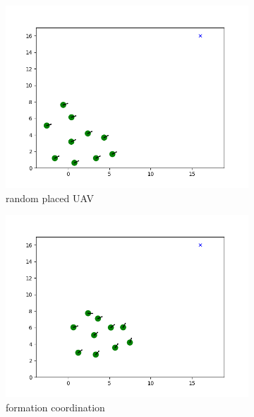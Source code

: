 \begin{figure}
     \centering
     \begin{subfigure}[b]{0.3\textwidth}
         \centering
         \includegraphics[width=\textwidth]{figures/reconfigure_1.png}
         \caption{random placed UAV}
         \label{before merging}
     \end{subfigure}
     \hfill
     \begin{subfigure}[b]{0.3\textwidth}
         \centering
         \includegraphics[width=\textwidth]{figures/reconfigure_2.png}
         \caption{formation coordination}
         \label{ew}
     \end{subfigure}
     \hfill
     \begin{subfigure}[b]{0.3\textwidth}

\end{subfigure}
\end{figure}
